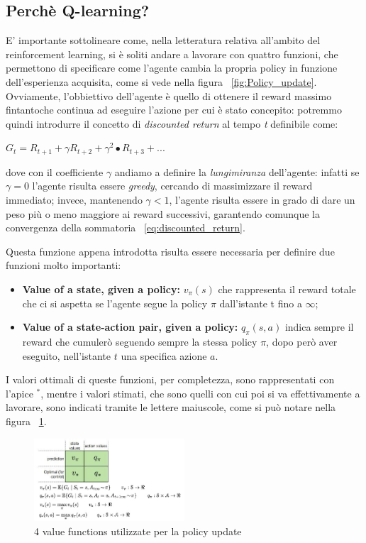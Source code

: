 \subsection{Perchè Q-learning?}
E' importante sottolineare come, nella letteratura relativa all'ambito del reinforcement learning, si è soliti andare a lavorare con quattro funzioni, che permettono di specificare come l'agente cambia la propria policy in funzione dell'esperienza acquisita, come si vede nella figura ~\ref{fig:Policy_update}.
Ovviamente, l'obbiettivo dell'agente è quello di ottenere il reward massimo fintantoche continua ad eseguire l'azione per cui è stato concepito: potremmo quindi introdurre il concetto di \textit{discounted return} al tempo \textit{t} definibile come:

\begin{center}
	$G_t = R_{t+1} + \gamma R_{t+2}+ \gamma^2\bullet R_{t+3} + ...$
	\label{eq:discounted_return}
\end{center}

dove con il coefficiente $\gamma$ andiamo a definire la \textit{lungimiranza} dell'agente: infatti se $\gamma = 0$ l'agente risulta essere \textit{greedy}, cercando di massimizzare il reward immediato; invece, mantenendo $\gamma < 1$, l'agente risulta essere in grado di dare un peso più o meno maggiore ai reward successivi, garantendo comunque la convergenza della sommatoria ~\ref{eq:discounted_return}.

Questa funzione appena introdotta risulta essere necessaria per definire due funzioni molto importanti:
\begin{itemize}
	\item \textbf{Value of a state, given a policy: } $v_\pi(s)$ che rappresenta il reward totale che ci si aspetta se l'agente segue la policy $\pi$ dall'istante t fino a $\infty$;
	\item \textbf{Value of a state-action pair, given a policy: } $q_\pi(s,a)$ indica sempre il reward che cumulerò seguendo sempre la stessa policy $\pi$, dopo però aver eseguito, nell'istante $t$ una specifica azione $a$.
\end{itemize}

I valori ottimali di queste funzioni, per completezza, sono rappresentati con l'apice $^*$, mentre i valori stimati, che sono quelli con cui poi si va effettivamente a lavorare, sono indicati tramite le lettere maiuscole, come si può notare nella figura ~\ref{fig:ValueFunctions}.

\begin{figure}[!h]
	\centering
	\includegraphics[width=0.5\textwidth]{Immagini/4_valueFunctions.JPG}
	\caption{4 value functions utilizzate per la policy update}
	\label{fig:ValueFunctions}
\end{figure}

